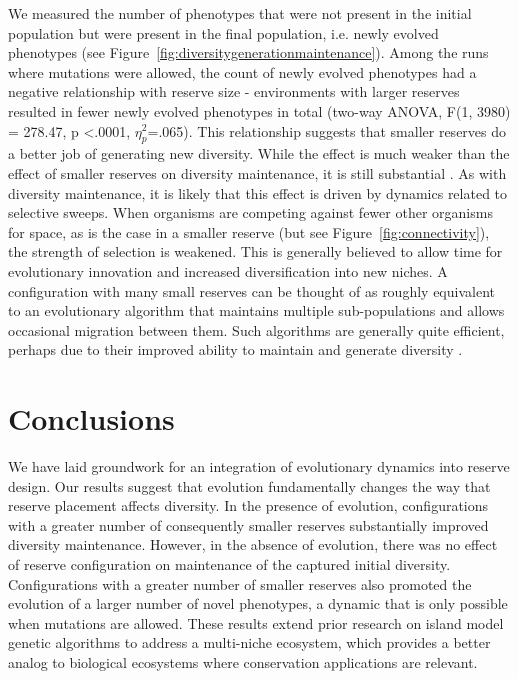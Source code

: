 \documentclass[letterpaper]{article}
\begin{document}
	We measured the number of phenotypes that were not present in the initial population but were present in the final population, i.e. newly evolved phenotypes (see Figure~\ref{fig:diversitygenerationmaintenance}). Among the runs where mutations were allowed, the count of newly evolved phenotypes had a negative relationship with reserve size - environments with larger reserves resulted in fewer newly evolved phenotypes in total (two-way ANOVA, F(1, 3980) = 278.47, p \textless .0001, $\eta_{p}^{2}$=.065). This relationship suggests that smaller reserves do a better job of generating new diversity. While the effect is much weaker than the effect of smaller reserves on diversity maintenance, it is still substantial \citep{lakens_calculating_2013}. As with diversity maintenance, it is likely that this effect is driven by dynamics related to selective sweeps. When organisms are competing against fewer other organisms for space, as is the case in a smaller reserve (but see Figure~\ref{fig:connectivity}), the strength of selection is weakened. This is generally believed to allow time for evolutionary innovation and increased diversification into new niches. A configuration with many small reserves can be thought of as roughly equivalent to an evolutionary algorithm that maintains multiple sub-populations and allows occasional migration between them. Such algorithms are generally quite efficient, perhaps due to their improved ability to maintain and generate diversity \citep{tomassini_spatially_2005}. 
%
%
%
%
%
%

\section{Conclusions}

We have laid groundwork for an integration of evolutionary dynamics into reserve design. Our results suggest that evolution fundamentally changes the way that reserve placement affects diversity. In the presence of evolution, configurations with a greater number of consequently smaller reserves substantially improved diversity maintenance. However, in the absence of evolution, there was no effect of reserve configuration on maintenance of the captured initial diversity. Configurations with a greater number of smaller reserves also promoted the evolution of a larger number of novel phenotypes, a dynamic that is only possible when mutations are allowed. These results extend prior research on island model genetic algorithms to address a multi-niche ecosystem, which provides a better analog to biological ecosystems where conservation applications are relevant.
    
\end{document}
